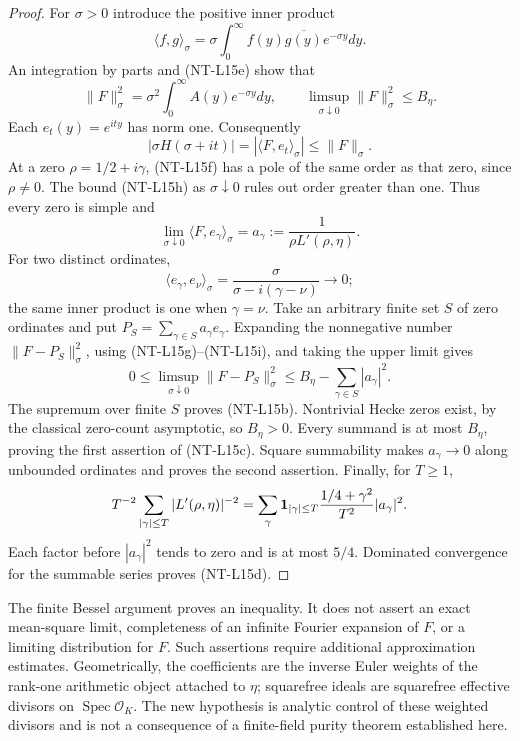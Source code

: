 \documentclass[11pt,a4paper]{article}
\begin{document}
\begin{proof}
For $\sigma>0$ introduce the positive inner product
\[
 \langle f,g\rangle_\sigma
       =\sigma\int_0^\infty f(y)\overline{g(y)}e^{-\sigma y}dy.
\]
An integration by parts and (NT-L15e) show that
\[
 \|F\|_\sigma^2
   =\sigma^2\int_0^\infty A(y)e^{-\sigma y}dy,
 \qquad \limsup_{\sigma\downarrow0}\|F\|_\sigma^2\le B_\eta.
                                                        \tag{NT-L15g}
\]
Each $e_t(y)=e^{ity}$ has norm one. Consequently
\[
 |\sigma H(\sigma+it)|
       =|\langle F,e_t\rangle_\sigma|
       \le\|F\|_\sigma.
                                                        \tag{NT-L15h}
\]
At a zero $\rho=1/2+i\gamma$, (NT-L15f) has a pole of the same order
as that zero, since $\rho\ne0$. The bound (NT-L15h) as
$\sigma\downarrow0$ rules out order greater than one. Thus every zero
is simple and
\[
 \lim_{\sigma\downarrow0}\langle F,e_\gamma\rangle_\sigma
       =a_\gamma:=\frac1{\rho L'(\rho,\eta)}.
                                                        \tag{NT-L15i}
\]
For two distinct ordinates,
\[
 \langle e_\gamma,e_\nu\rangle_\sigma
       =\frac\sigma{\sigma-i(\gamma-\nu)}\longrightarrow0;
\]
the same inner product is one when $\gamma=\nu$.
Take an arbitrary finite set $S$ of zero ordinates and put
$P_S=\sum_{\gamma\in S}a_\gamma e_\gamma$.
Expanding the nonnegative number $\|F-P_S\|_\sigma^2$, using
(NT-L15g)--(NT-L15i), and taking the upper limit gives
\[
 0\le\limsup_{\sigma\downarrow0}\|F-P_S\|_\sigma^2
       \le B_\eta-\sum_{\gamma\in S}|a_\gamma|^2.
\]
The supremum over finite $S$ proves (NT-L15b). Nontrivial Hecke zeros
exist, by the classical zero-count asymptotic, so $B_\eta>0$.
Every summand is at most $B_\eta$, proving the first assertion of
(NT-L15c). Square summability makes $a_\gamma\to0$ along unbounded
ordinates and proves the second assertion. Finally, for $T\ge1$,
\[
 T^{-2}\sum_{|\gamma|\le T}|L'(\rho,\eta)|^{-2}
   =\sum_\gamma {\bf1}_{|\gamma|\le T}
           \frac{1/4+\gamma^2}{T^2}|a_\gamma|^2.
\]
Each factor before $|a_\gamma|^2$ tends to zero and is at most $5/4$.
Dominated convergence for the summable series proves (NT-L15d).
\end{proof}

The finite Bessel argument proves an inequality. It does not assert an
exact mean-square limit, completeness of an infinite Fourier expansion
of $F$, or a limiting distribution for $F$. Such assertions require
additional approximation estimates.
Geometrically, the coefficients are the inverse Euler weights of the
rank-one arithmetic object attached to $\eta$; squarefree ideals are
squarefree effective divisors on $\operatorname{Spec}\mathcal O_K$.
The new hypothesis is analytic control of these weighted divisors and
is not a consequence of a finite-field purity theorem established here.
\end{document}
